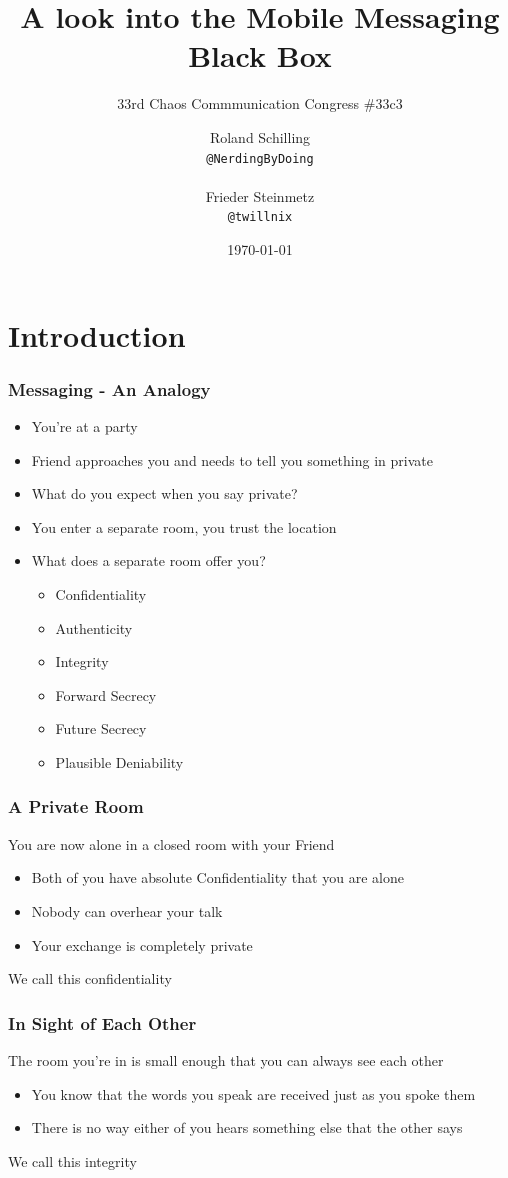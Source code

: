 \documentclass[aspectratio=169]{beamer}
\title{A look into the Mobile Messaging Black Box}
\subtitle{\scriptsize{33rd Chaos Commmunication Congress \#33c3}}
\date{\today}
\author{
	\parbox[t]{1.2in}{Roland Schilling}{\scriptsize{\texttt{@NerdingByDoing}}}\\
	\parbox[t]{1.2in}{Frieder Steinmetz}{\scriptsize{\texttt{@twillnix}}}
}
\institute{Hamburg University of Technology\\
Security in Distributed Applications}
\begin{document}
\maketitle

\section{Introduction}

\begin{frame}
	\frametitle{Messaging - An Analogy}
	\begin{itemize}
		\item You're at a party
		\item Friend approaches you and needs to tell you something \alert{in private}
		\item What do you expect when you say \alert{private}?
		\item You enter a separate room, you trust the location
		\item What does a separate room offer you?
			\begin{itemize}
				\item Confidentiality
				\item Authenticity
				\item Integrity
				\item Forward Secrecy
				\item Future Secrecy
				\item Plausible Deniability
			\end{itemize}
	\end{itemize}
\end{frame}

\begin{frame}
	\frametitle{A Private Room}
	You are now alone in a closed room with your Friend
	\begin{itemize}
		\item Both of you have absolute Confidentiality that you are alone
		\item Nobody can overhear your talk
		\item Your exchange is completely private
	\end{itemize}
	We call this \alert{confidentiality}
\end{frame}

\begin{frame}
	\frametitle{In Sight of Each Other}
	The room you're in is small enough that you can always see each other
	\begin{itemize}
		\item You know that the words you speak are received just as you spoke them
		\item There is no way either of you hears something else that the other says
	\end{itemize}
	We call this \alert{integrity}
\end{frame}
\end{document}
